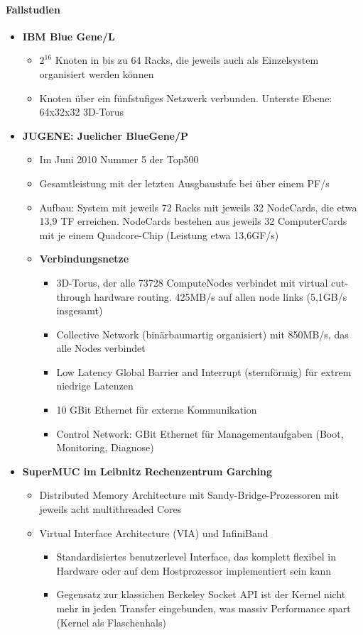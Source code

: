	\paragraph{Fallstudien}
	\begin{itemize}
		\item \textbf{IBM Blue Gene/L}
		\begin{itemize}
			\item \(2^16\) Knoten in bis zu 64 Racks, die jeweils auch als Einzelsystem organisiert werden können
			\item Knoten über ein fünfstufiges Netzwerk verbunden. Unterste Ebene: 64x32x32 3D-Torus
		\end{itemize}
		\item \textbf{JUGENE: Juelicher BlueGene/P}
		\begin{itemize}
			\item Im Juni 2010 Nummer 5 der Top500
			\item Gesamtleistung mit der letzten Ausgbaustufe bei über einem PF/s
			\item Aufbau: System mit jeweils 72 Racks mit jeweils 32 NodeCards, die etwa 13,9 TF erreichen. NodeCards bestehen aus jeweils 32 ComputerCards mit je einem Quadcore-Chip (Leistung etwa 13,6GF/s)
			\item \textbf{Verbindungsnetze}
			\begin{itemize}
				\item 3D-Torus, der alle 73728 ComputeNodes verbindet mit virtual cut-through hardware routing. 425MB/s auf allen node links (5,1GB/s insgesamt)
				\item Collective Network (binärbaumartig organisiert) mit 850MB/s, das alle Nodes verbindet
				\item Low Latency Global Barrier and Interrupt (sternförmig) für extrem niedrige Latenzen
				\item 10 GBit Ethernet für externe Kommunikation
				\item Control Network: GBit Ethernet für Managementaufgaben (Boot, Monitoring, Diagnose)
			\end{itemize}
		\end{itemize}
		\item \textbf{SuperMUC im Leibnitz Rechenzentrum Garching}
		\begin{itemize}
			\item Distributed Memory Architecture mit Sandy-Bridge-Prozessoren mit jeweils acht multithreaded Cores
			\item Virtual Interface Architecture (VIA) und InfiniBand
			\begin{itemize}
				\item Standardisiertes benutzerlevel Interface, das komplett flexibel in Hardware  oder auf dem Hostprozessor implementiert sein kann
				\item Gegensatz zur klassichen Berkeley Socket API ist der Kernel nicht mehr in jeden Transfer eingebunden, was massiv Performance spart (Kernel als Flaschenhals)
			\end{itemize}
		\end{itemize}
	\end{itemize}
